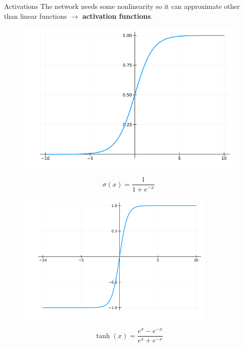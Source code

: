 \documentclass{beamer}
\begin{document}
\begin{frame}{Activations}
    The network needs some nonlinearity so it can approximate other than linear functions $\rightarrow$ \textbf{activation functions}.

    \begin{minipage}[t]{0.3\textwidth}
        \begin{figure}
            \centering
            \includegraphics[width=\textwidth]{./images/14_sigmoid.png}
        \end{figure}
        $$\sigma(x) = \frac{1}{1 + e^{-x}}$$
    \end{minipage}
    \hfill
    \begin{minipage}[t]{0.35\textwidth}
        \begin{figure}
            \centering
            \includegraphics[width=0.86\textwidth]{./images/14_tanh.png}
        \end{figure}
        $$\tanh(x) = \frac{e^x - e^{-x}}{e^x + e^{-x}}$$
    \end{minipage}

\end{frame}
\end{document}
